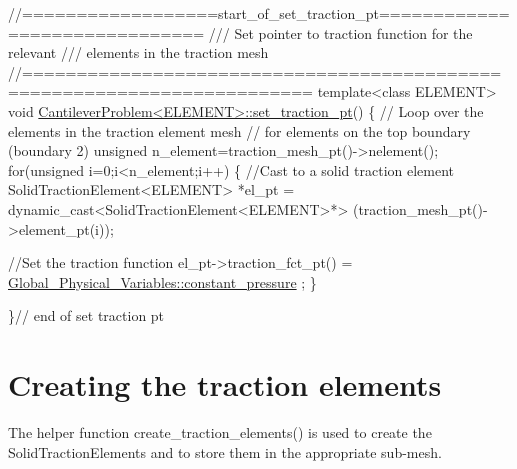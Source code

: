  
\begin{DoxyCodeInclude}
\textcolor{comment}{//==================start\_of\_set\_traction\_pt==============================}
\textcolor{comment}{/// Set pointer to traction function for the relevant}
\textcolor{comment}{}\textcolor{comment}{/// elements in the traction mesh}
\textcolor{comment}{}\textcolor{comment}{//========================================================================}
\textcolor{keyword}{template}<\textcolor{keyword}{class} ELEMENT>
\textcolor{keywordtype}{void} \hyperlink{classCantileverProblem_a96a9716947a15930f3881fcec6d448e2}{CantileverProblem<ELEMENT>::set\_traction\_pt}()
\{
 \textcolor{comment}{// Loop over the elements in the traction element mesh}
 \textcolor{comment}{// for elements on the top boundary (boundary 2)}
 \textcolor{keywordtype}{unsigned} n\_element=traction\_mesh\_pt()->nelement();
 \textcolor{keywordflow}{for}(\textcolor{keywordtype}{unsigned} i=0;i<n\_element;i++)
  \{
   \textcolor{comment}{//Cast to a solid traction element}
   SolidTractionElement<ELEMENT> *el\_pt = 
    \textcolor{keyword}{dynamic\_cast<}SolidTractionElement<ELEMENT>*\textcolor{keyword}{>}
    (traction\_mesh\_pt()->element\_pt(i));

   \textcolor{comment}{//Set the traction function}
   el\_pt->traction\_fct\_pt() = \hyperlink{namespaceGlobal__Physical__Variables_a19f4e20a92e7d216b4d2b00308f96917}{Global\_Physical\_Variables::constant\_pressure}
      ;
  \}
 
\}\textcolor{comment}{// end of set traction pt}

\end{DoxyCodeInclude}




 

\hypertarget{index_create_traction}{}\section{Creating the traction elements}\label{index_create_traction}
The helper function {\ttfamily create\+\_\+traction\+\_\+elements()} is used to create the {\ttfamily Solid\+Traction\+Elements} and to store them in the appropriate sub-\/mesh.

